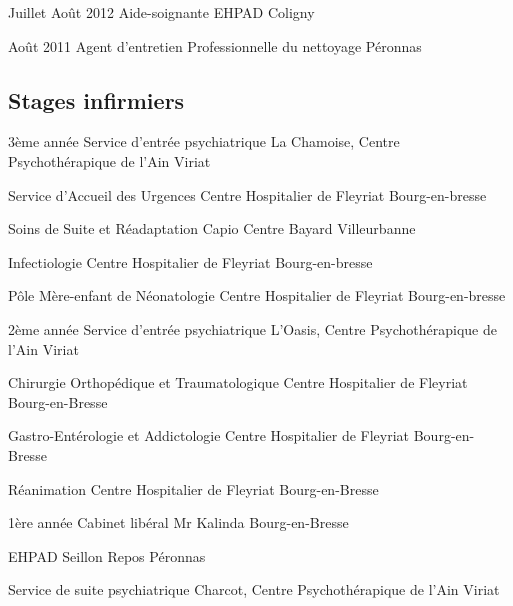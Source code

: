 \documentclass[10pt,a4paper]{moderncv}
\begin{document}
\cventry
    {Juillet Août 2012}
	{Aide-soignante}
	{EHPAD}
	{Coligny}
	{}
	{}

\cventry
	{Août 2011}
	{Agent d'entretien}
	{Professionnelle du nettoyage}
	{Péronnas}
	{}
	{}

\vspace*{3mm}

\subsection{Stages infirmiers}
	
\cventry
	{3ème année}
	{Service d'entrée psychiatrique}
	{La Chamoise, Centre Psychothérapique de l’Ain}
	{Viriat}
	{}
	{}

\cventry
	{}
	{Service d’Accueil des Urgences}
	{Centre Hospitalier de Fleyriat}
	{Bourg-en-bresse}
	{}
	{}

\cventry
	{}
	{Soins de Suite et Réadaptation}
	{Capio Centre Bayard}
	{Villeurbanne}
	{}
	{}

\cventry
	{}
	{Infectiologie}
	{Centre Hospitalier de Fleyriat}
	{Bourg-en-bresse}
	{}
	{}

\cventry
	{}
	{Pôle Mère-enfant de Néonatologie}
	{Centre Hospitalier de Fleyriat}
	{Bourg-en-bresse}
	{}
	{}

\vspace*{3mm}

\cventry
	{2ème année}
	{Service d’entrée psychiatrique}
	{L'Oasis, Centre Psychothérapique de l’Ain}
	{Viriat}
	{}
	{}

\cventry
	{}
	{Chirurgie Orthopédique et Traumatologique}
	{Centre Hospitalier de Fleyriat}
	{Bourg-en-Bresse}
	{}
	{}

\cventry
	{}
	{Gastro-Entérologie et Addictologie}
    {Centre Hospitalier de Fleyriat}
	{Bourg-en-Bresse}
	{}
	{}

\cventry
	{}
	{Réanimation}
	{Centre Hospitalier de Fleyriat}
	{Bourg-en-Bresse}
	{}
	{}

\vspace*{3mm}

\cventry
	{1ère année}
	{Cabinet libéral}
	{Mr Kalinda}
	{Bourg-en-Bresse}
	{}
	{}

\cventry
	{}
	{EHPAD}
	{Seillon Repos}
	{Péronnas}
	{}
	{}

\cventry
	{}
	{Service de suite psychiatrique}
	{Charcot, Centre Psychothérapique de l’Ain}
	{Viriat}
	{}
	{}


\end{document}

